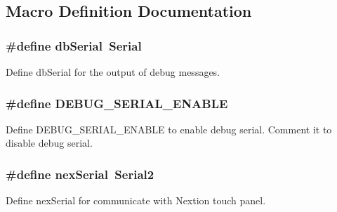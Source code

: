 \subsection{Macro Definition Documentation}
\hypertarget{group___configuration_ga9abc2a70f2ba1b5a4edc63e807ee172e}{
\subsubsection[{db\+Serial}]{\setlength{\rightskip}{0pt plus 5cm}\#define db\+Serial~Serial}}\label{group___configuration_ga9abc2a70f2ba1b5a4edc63e807ee172e}
Define db\+Serial for the output of debug messages. \hypertarget{group___configuration_ga9b3a5e4cc28fc65f02c9b197e8a4c955}{
\subsubsection[{D\+E\+B\+U\+G\+\_\+\+S\+E\+R\+I\+A\+L\+\_\+\+E\+N\+A\+B\+L\+E}]{\setlength{\rightskip}{0pt plus 5cm}\#define D\+E\+B\+U\+G\+\_\+\+S\+E\+R\+I\+A\+L\+\_\+\+E\+N\+A\+B\+L\+E}}\label{group___configuration_ga9b3a5e4cc28fc65f02c9b197e8a4c955}
Define D\+E\+B\+U\+G\+\_\+\+S\+E\+R\+I\+A\+L\+\_\+\+E\+N\+A\+B\+L\+E to enable debug serial. Comment it to disable debug serial. \hypertarget{group___configuration_ga2738b05a77cd5052e440af5b00b0ecbd}{
\subsubsection[{nex\+Serial}]{\setlength{\rightskip}{0pt plus 5cm}\#define nex\+Serial~Serial2}}\label{group___configuration_ga2738b05a77cd5052e440af5b00b0ecbd}
Define nex\+Serial for communicate with Nextion touch panel. 